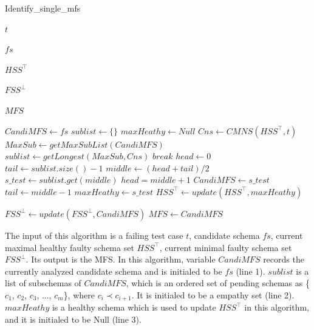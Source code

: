 \documentclass{sig-alternate-05-2015}
\begin{document}
{{\begin{algorithm}\label{al:identifyOneMFS}
  \caption{Identify\_single\_mfs}
  \begin{algorithmic}[1]
     \Require  $t$ 


     $fs$ 

     $HSS^{\top}$ 

     $FSS^{\bot}$ 

     \Ensure  $MFS$ 

   \State $CandiMFS \leftarrow fs$
   \State $sublist \leftarrow \{\}$
   \State $maxHeathy \leftarrow Null$
        \State $Cns \leftarrow CMNS(HSS^{\top}, t) $
        \State $MaxSub \leftarrow getMaxSubList(CandiMFS)$
        \State $sublist \leftarrow  getLongest(MaxSub, Cns)$
            \State $break$
         \EndIf
        \State $head  \leftarrow 0$
        \State $tail \leftarrow sublist.size() - 1 $
        \State $middle \leftarrow (head + tail) / 2$
        \State $s\_test \leftarrow sublist.get(middle)$
            \State $head = middle + 1$
            \State $CandiMFS \leftarrow s\_test$
        \Else
            \State $tail \leftarrow middle - 1  $
            \State $maxHeathy \leftarrow s\_test$
        \EndIf
        \EndWhile
        \State $HSS^{\top} \leftarrow update(HSS^{\top}, maxHeathy)$

    \EndWhile
    \State $FSS^{\bot} \leftarrow update(FSS^{\bot}, CandiMFS)$
    \State $MFS \leftarrow  CandiMFS$
  \end{algorithmic}
\end{algorithm}

The input of this algorithm is a failing test case $t$,  candidate schema $fs$, current maximal healthy faulty schema set $HSS^{\top}$, current minimal faulty schema set $FSS^{\bot}$. Its output is the MFS. In this algorithm, variable $CandiMFS$ records the currently analyzed candidate schema and is initialed to be $fs$ (line 1). $sublist$ is a list of subschemas of $CandiMFS$, which is an ordered set of pending schemas as \{$c_{1}$, $c_{2}$, $c_{3}$, ..., $c_{m}$\}, where $c_{i} \prec c_{i+1}$. It is initialed to be a empathy set (line 2). $maxHeathy$ is a healthy schema which is used to update  $HSS^{\top}$ in this algorithm, and it is initialed to be Null (line 3).

}}
\end{document}
